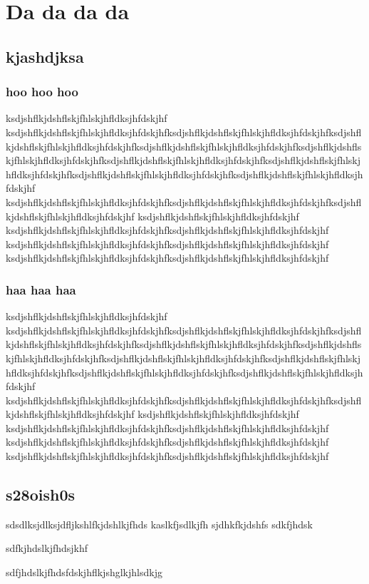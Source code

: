 \chapter{Da da da da}

\section{kjashdjksa}

\subsection{hoo hoo hoo}

ksdjshflkjdshflskjfhlskjhfldksjhfdskjhf ksdjshflkjdshflskjfhlskjhfldksjhfdskjhfksdjshflkjdshflskjfhlskjhfldksjhfdskjhfksdjshflkjdshflskjfhlskjhfldksjhfdskjhfksdjshflkjdshflskjfhlskjhfldksjhfdskjhfksdjshflkjdshflskjfhlskjhfldksjhfdskjhfksdjshflkjdshflskjfhlskjhfldksjhfdskjhfksdjshflkjdshflskjfhlskjhfldksjhfdskjhfksdjshflkjdshflskjfhlskjhfldksjhfdskjhfksdjshflkjdshflskjfhlskjhfldksjhfdskjhf ksdjshflkjdshflskjfhlskjhfldksjhfdskjhfksdjshflkjdshflskjfhlskjhfldksjhfdskjhfksdjshflkjdshflskjfhlskjhfldksjhfdskjhf ksdjshflkjdshflskjfhlskjhfldksjhfdskjhf ksdjshflkjdshflskjfhlskjhfldksjhfdskjhfksdjshflkjdshflskjfhlskjhfldksjhfdskjhf ksdjshflkjdshflskjfhlskjhfldksjhfdskjhfksdjshflkjdshflskjfhlskjhfldksjhfdskjhf ksdjshflkjdshflskjfhlskjhfldksjhfdskjhfksdjshflkjdshflskjfhlskjhfldksjhfdskjhf 

\subsection{haa haa haa}

ksdjshflkjdshflskjfhlskjhfldksjhfdskjhf ksdjshflkjdshflskjfhlskjhfldksjhfdskjhfksdjshflkjdshflskjfhlskjhfldksjhfdskjhfksdjshflkjdshflskjfhlskjhfldksjhfdskjhfksdjshflkjdshflskjfhlskjhfldksjhfdskjhfksdjshflkjdshflskjfhlskjhfldksjhfdskjhfksdjshflkjdshflskjfhlskjhfldksjhfdskjhfksdjshflkjdshflskjfhlskjhfldksjhfdskjhfksdjshflkjdshflskjfhlskjhfldksjhfdskjhfksdjshflkjdshflskjfhlskjhfldksjhfdskjhf ksdjshflkjdshflskjfhlskjhfldksjhfdskjhfksdjshflkjdshflskjfhlskjhfldksjhfdskjhfksdjshflkjdshflskjfhlskjhfldksjhfdskjhf ksdjshflkjdshflskjfhlskjhfldksjhfdskjhf ksdjshflkjdshflskjfhlskjhfldksjhfdskjhfksdjshflkjdshflskjfhlskjhfldksjhfdskjhf ksdjshflkjdshflskjfhlskjhfldksjhfdskjhfksdjshflkjdshflskjfhlskjhfldksjhfdskjhf ksdjshflkjdshflskjfhlskjhfldksjhfdskjhfksdjshflkjdshflskjfhlskjhfldksjhfdskjhf 

\section{s28oish0s}

sdsdlksjdlksjdfljkshlfkjdshlkjfhds kaslkfjsdlkjfh sjdhkfkjdshfs sdkfjhdsk

sdfkjhdslkjfhdsjkhf

sdfjhdslkjfhdsfdskjhflkjshglkjhlsdkjg